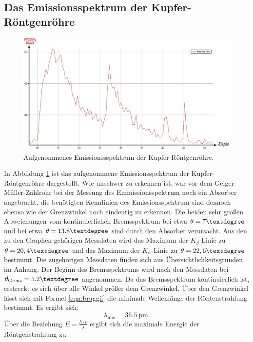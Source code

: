 \FloatBarrier
\subsection{Das Emissionsspektrum der Kupfer-Röntgenröhre}
\begin{figure}
	\includegraphics[width=1.0\textwidth]{nIKO_und_jULIAN_ÜLADS/Kupfaemmision.jpg}
	\caption{Aufgenommenes Emissionssspektrum der Kupfer-Röntgenröhre.}
	\label{fig:emissionlol}
\end{figure}
In Abbildung \ref{fig:emissionlol} ist das aufgenommene Emissionsspektrum der Kupfer-Röntgenröhre dargestellt.
Wie unschwer zu erkennen ist, war vor dem Geiger-Müller-Zählrohr bei der Messung des Emmissionsspektrum noch ein Absorber angebracht, die benötigten Kennlinien des Emissionsspektrum sind dennoch ebenso wie der Grenzwinkel noch eindeutig zu erkennen.
Die beiden sehr großen Abweichungen vom kontinuierlichen Bremsspektrum bei etwa $\theta=7\textdegree$ und bei etwa $\theta=13.8\textdegree$ sind durch den Absorber verursacht.
Aus den zu den Graphen gehörigen Messdaten wird das Maximum der $K_\beta$-Linie zu
$\theta=20,4\textdegree$ und das Maximum der $K_\alpha$-Linie zu $\theta=22,6\textdegree$ bestimmt. Die zugehörigen Messdaten finden sich aus Übersichtlichkeitsgründen im Anhang.
Der Beginn des Bremsspektrums wird nach den Messdaten bei $\theta_\mathrm{Grenz}=5.2\textdegree$ angenommen. Da das Bremsspektrum kontinuierlich ist, erstreckt es sich über alle Winkel größer dem Grenzwinkel.
Über den Grenzwinkel lässt sich mit Formel \eqref{eqn:braggii} die minimale Wellenlänge der Röntenstrahlung bestimmt.
Es ergibt sich:
\begin{equation*}
	 \lambda_\mathrm{min}=\SI{36.5}{\pico\meter} \text{.}
\end{equation*}
Über die Beziehung $E=\frac{h\cdot c}{\lambda}$ ergibt sich die maximale Energie der Röntgenstrahlung zu:
